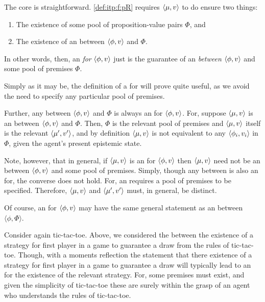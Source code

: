 \begin{note}
  The core is straightforward.
  \ref{def:itp:f:pR} requires \(\langle \mu, v \rangle\) to do ensure two things:
  \begin{enumerate}
  \item The existence of some pool of proposition-value pairs \(\Phi\), and
  \item The existence of an  between \(\langle \phi, v \rangle\) and \(\Phi\).
  \end{enumerate}
  In other words, then, an  \emph{for} \(\langle \phi, v \rangle\) just is the guarantee of an  \emph{between} \(\langle \phi, v \rangle\) and some pool of premises \(\Phi\).

  Simply as it may be, the definition of a  for will prove quite useful, as we avoid the need to specify any particular pool of premises.

  Further, any  between \(\langle \phi, v \rangle\) and \(\Phi\) is always an  for \(\langle \phi, v \rangle\).
  For, suppose \(\langle \mu, v \rangle\) is an  between \(\langle \phi, v \rangle\) and \(\Phi\).
  Then, \(\Phi\) is the relevant pool of premises and \(\langle \mu, v \rangle\) itself is the relevant \(\langle \mu', v' \rangle\), and by definition \(\langle \mu, v \rangle\) is not equivalent to any \(\langle \phi_{i}, v_{i} \rangle\) in \(\Phi\), given the agent's present epistemic state.

  Note, however, that in general, if \(\langle \mu, v \rangle\) is an  for \(\langle \phi, v \rangle\) then \(\langle \mu, v \rangle\) need not be an  between \(\langle \phi, v \rangle\) and some pool of premises.
  Simply, though any  between is also an  for, the converse does not hold.
  For, an  requires a pool of premises to be specified.
  Therefore, \(\langle \mu, v \rangle\) and \(\langle \mu', v' \rangle\) must, in general, be distinct.

  Of course, an  for \(\langle \phi, v \rangle\) may have the same general statement as an  between \(\langle \phi,\Phi \rangle\).

  Consider again tic-tac-toe.
  Above, we considered the  between the existence of a strategy for first player in a game to guarantee a draw from the rules of tic-tac-toe.
  Though, with a moments reflection the statement that there existence of a strategy for first player in a game to guarantee a draw will typically lead to an  for the existence of the relevant strategy.
  For, some premises must exist, and given the simplicity of tic-tac-toe these are surely within the grasp of an agent who understands the rules of tic-tac-toe.
\end{note}

